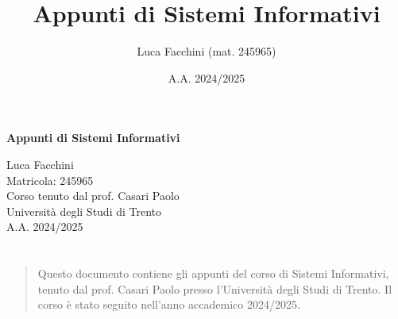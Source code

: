 \documentclass[twoside]{report}
\title{Appunti di Sistemi Informativi}
\author{Luca Facchini (mat. 245965)}
\date{A.A. 2024/2025}
\makeatletter
\renewenvironment{abstract}{%
    \if@twocolumn
        \section*{\abstractname}%
    \else
        \begin{center}%
            {\bfseries \abstractname\vspace{-.5em}\vspace{\z@}}%
        \end{center}%
        \small
        \begin{quotation}
    \fi}
    {\if@twocolumn\else\end{quotation}\fi}
\makeatother
\begin{document}
    \begin{titlepage}
        \centering  %
        {\Huge\textbf{Appunti di Sistemi Informativi}} \\[1cm] %
        \vspace{0.5cm}
        
        {\Large Luca Facchini} \\ %
        \vspace{0.3cm}
        {\large Matricola: 245965} \\[2cm] %
        
        {\large Corso tenuto dal prof. Casari Paolo} \\[0.3cm] %
        {\large Università degli Studi di Trento} \\[1.5cm]
        
        {\large A.A. 2024/2025} \\[3cm] %
        
        \vfill
        \begin{abstract}
            Questo documento contiene gli appunti del corso di Sistemi Informativi, tenuto dal prof. Casari Paolo presso l'Università degli Studi di Trento. Il corso è stato seguito nell'anno accademico 2024/2025.
        \end{abstract}
        
        \vfill  %
    \end{titlepage}

    \pagestyle{stdPage}
    
    \begingroup
        \tableofcontents
        \thispagestyle{stdPage}
    \endgroup
    
    
    
    
    
    
\end{document}
